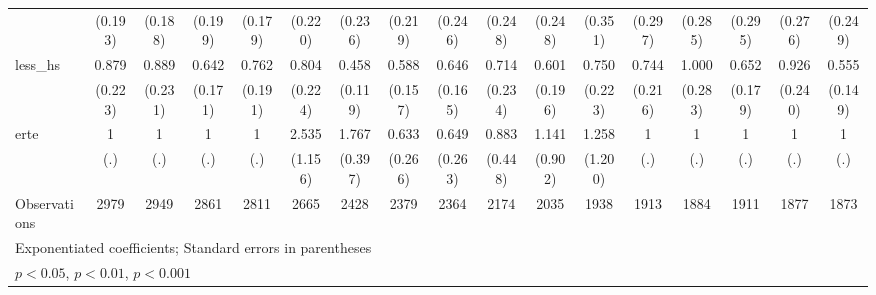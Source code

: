 {\begin{tabular}{l*{16}{c}}
                    &     (0.193)         &     (0.188)         &     (0.199)         &     (0.179)         &     (0.220)         &     (0.236)         &     (0.219)         &     (0.246)         &     (0.248)         &     (0.248)         &     (0.351)         &     (0.297)         &     (0.285)         &     (0.295)         &     (0.276)         &     (0.249)         \\
[1em]
less\_hs             &       0.879         &       0.889         &       0.642         &       0.762         &       0.804         &       0.458\sym{**} &       0.588\sym{*}  &       0.646         &       0.714         &       0.601         &       0.750         &       0.744         &       1.000         &       0.652         &       0.926         &       0.555\sym{*}  \\
                    &     (0.223)         &     (0.231)         &     (0.171)         &     (0.191)         &     (0.224)         &     (0.119)         &     (0.157)         &     (0.165)         &     (0.234)         &     (0.196)         &     (0.223)         &     (0.216)         &     (0.283)         &     (0.179)         &     (0.240)         &     (0.149)         \\
[1em]
erte                &           1         &           1         &           1         &           1         &       2.535\sym{*}  &       1.767\sym{*}  &       0.633         &       0.649         &       0.883         &       1.141         &       1.258         &           1         &           1         &           1         &           1         &           1         \\
                    &         (.)         &         (.)         &         (.)         &         (.)         &     (1.156)         &     (0.397)         &     (0.266)         &     (0.263)         &     (0.448)         &     (0.902)         &     (1.200)         &         (.)         &         (.)         &         (.)         &         (.)         &         (.)         \\
\hline
Observations        &        2979         &        2949         &        2861         &        2811         &        2665         &        2428         &        2379         &        2364         &        2174         &        2035         &        1938         &        1913         &        1884         &        1911         &        1877         &        1873         \\
\hline\hline
\multicolumn{17}{l}{\footnotesize Exponentiated coefficients; Standard errors in parentheses}\\
\multicolumn{17}{l}{\footnotesize \sym{*} \(p<0.05\), \sym{**} \(p<0.01\), \sym{***} \(p<0.001\)}\\
\end{tabular}
}
